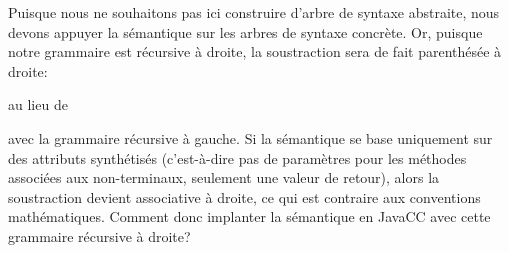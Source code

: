 \documentclass[11pt,a4paper]{article}
\newcommand{\JavaCC}{\textsf{JavaCC}\xspace}
\begin{document}
\noindent Puisque nous ne souhaitons pas ici construire d'arbre de
syntaxe abstraite, nous devons appuyer la sémantique sur les arbres de
syntaxe concrète. Or, puisque notre grammaire est récursive à droite,
la soustraction sera de fait parenthésée à droite:
\begin{center}
\begin{minipage}{.3\linewidth}
\end{minipage}
au lieu de
\hspace*{10pt}
\begin{minipage}{.3\linewidth}
\end{minipage}
\end{center}

\noindent avec la grammaire récursive à gauche. Si la sémantique se
base uniquement sur des attributs synthétisés (c'est-à-dire pas de
paramètres pour les méthodes associées aux non-terminaux, seulement
une valeur de retour), alors la soustraction devient associative à
droite, ce qui est contraire aux conventions mathématiques. Comment
donc implanter la sémantique en \JavaCC avec cette grammaire récursive
à droite?
\end{document}
